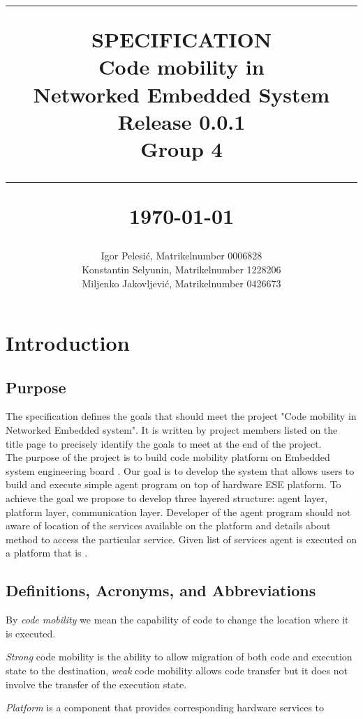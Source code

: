 \documentclass{scrreprt}
\title{%
\flushright
\rule{16cm}{2pt}\vskip1cm
\Huge{SPECIFICATION}\\
\vspace{1cm}
Code mobility in \\Networked Embedded System\\
\vspace{1cm}
\LARGE{Release 0.0.1\\}
\vspace{1cm}
Group 4\\
\vspace{1cm}
\author{Igor Pelesi\'c, Matrikelnumber 0006828\\
Konstantin Selyunin, Matrikelnumber 1228206\\
Miljenko Jakovljevi\'c, Matrikelnumber 0426673 }
\vfill
\rule{16cm}{2pt}\vskip1cm
\date{}
\today
}
\begin{document}
\maketitle
\tableofcontents
\renewcommand{\familydefault}{\sfdefault}
\clearpage
\chapter{Introduction}

	\section{Purpose}

The specification defines the goals that should meet the project "Code mobility in Networked Embedded system". It is written by project members listed on the title page to precisely identify the goals to meet at the end of the project.
\\
\noindent
The purpose of the project is to build code mobility platform on Embedded system engineering board \cite{Gallaher}. Our goal is to develop the system that allows users to build and execute simple agent program on top of  hardware ESE platform. To achieve the goal we propose to develop three layered structure: agent layer, platform layer, communication layer. Developer of the agent program should not aware of location of the services available on the platform and details about method to access the particular service. Given list of services agent is executed on a platform that is .


	\section{Definitions, Acronyms, and Abbreviations}

By \emph{code mobility} we mean the capability of code to change the location where it is executed.

\emph{Strong} code mobility is the ability to allow migration of both code and execution state to the destination, \emph{weak} code mobility allows code transfer but it does not involve the transfer of the execution state.

\emph{Platform} is a component that provides corresponding hardware services to 
\end{document}
